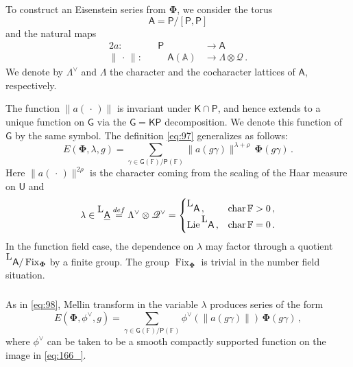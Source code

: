 \documentclass[14pt]{extarticle}
\newcommand{\A}{\mathbb{A}}
\newcommand{\F}{\mathbb{F}}
\newcommand{\bA}{\mathsf{A}}
\newcommand{\bG}{\mathsf{G}}
\newcommand{\sP}{\mathsf{P}}
\newcommand{\bU}{\mathsf{U}}
\newcommand{\bK}{\mathsf{K}}
\newcommand{\cQ}{\mathscr{Q}}
\newcommand{\La}{{}^{\raisebox{2pt}{\textup{\tiny\textsf{L}}}}}
\newcommand{\uA}{\underline{\bA}}
\newcommand{\bPhi}{\boldsymbol{\Phi}}
\newcommand{\eqdef}{\overset{\tiny\textup{def}}=}
\DeclareMathOperator{\Lie}{Lie}
\DeclareMathOperator{\chr}{char}
\DeclareMathOperator{\Fix}{Fix}
\theoremstyle{definition}
\begin{document}
\subsubsection{}
To construct an Eisenstein series from $\bPhi$, we consider the torus
\[
  \bA = \sP/[\sP,\sP]
  \]
  and the natural maps
  \begin{alignat}{2}
    a:&& \sP & \to \bA \\
    \| \, \cdot \, \|: && \quad \bA(\A) & \to \Lambda \otimes
    \cQ \label{eq:166_}\,. 
  \end{alignat}
 We denote by  $\Lambda^\vee$ and  $\Lambda$ the character and the
 cocharacter lattices of $\bA$,
 respectively. 


  The function $\| a(\, \cdot \, )\|$ is invariant under
  $\bK \cap \sP$, and hence extends to a unique
  function on $\bG$ via 
  the $\bG = \bK \sP$ decomposition. We denote this function
  of $\bG$ by the same symbol. The definition
  \eqref{eq:97}  generalizes as follows: 
\begin{equation}
E(\bPhi, \lambda,g) = \sum_{\gamma \in \bG(\F)/\sP(\F)}
\| a(g \gamma)\|^{\lambda+\rho} \, \bPhi(g
\gamma)\,. \label{eq:97bis} 
\end{equation}
%
Here $\| a(\, \cdot \,)\|^{2\rho}$ is the character coming
from the scaling of the Haar measure on $\bU$ and 
\[
  \lambda \in \La \uA \eqdef \Lambda^\vee \otimes \cQ^\vee =
  \begin{cases}
  \La \bA \,, &\chr \F >0 \,,\\
  \Lie \La \bA\,, & \chr \F = 0 \,. 
\end{cases}
\]
In the function field case, the dependence on $\lambda$ may
factor through a quotient $\La  \bA / \Fix_{\bPhi}$ by
a finite group. The group $\Fix_{\bPhi}$ is trivial in the number field
situation. 

\subsubsection{} 

As in
\eqref{eq:98}, Mellin transform in the variable $\lambda$
produces series of the form
%
\begin{equation}
  \label{eq:169}
  E(\bPhi, \phi^\vee,g) = \sum_{\gamma \in \bG(\F)/\sP(\F)}
\phi^\vee(\| a(g \gamma)\|)\, \bPhi(g
\gamma)\,,
\end{equation}
%
where $\phi^\vee$ can be taken to be a smooth compactly
supported function on the image in  \eqref{eq:166_}.
\end{document}

